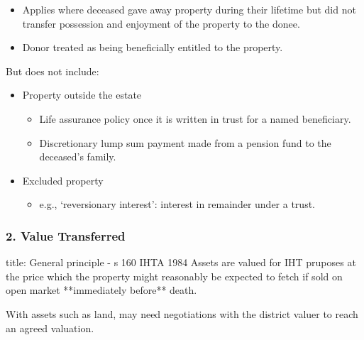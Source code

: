 \documentclass[
]{article}
\newenvironment{Shaded}{}{}
\newcommand{\NormalTok}[1]{#1}
\providecommand{\tightlist}{%
  \setlength{\itemsep}{0pt}\setlength{\parskip}{0pt}}
\begin{document}
\begin{itemize}
\begin{itemize}
    \begin{itemize}
    \tightlist
    \item
      Applies where deceased gave away property during their lifetime
      but did not transfer possession and enjoyment of the property to
      the donee.
    \item
      Donor treated as being beneficially entitled to the property.
    \end{itemize}
  \end{itemize}
\end{itemize}

But does not include:

\begin{itemize}
\tightlist
\item
  Property outside the estate

  \begin{itemize}
  \tightlist
  \item
    Life assurance policy once it is written in trust for a named
    beneficiary.
  \item
    Discretionary lump sum payment made from a pension fund to the
    deceased's family.
  \end{itemize}
\item
  Excluded property

  \begin{itemize}
  \tightlist
  \item
    e.g., `reversionary interest': interest in remainder under a trust.
  \end{itemize}
\end{itemize}

\hypertarget{value-transferred}{%
\subsubsection{2. Value Transferred}\label{value-transferred}}

\begin{Shaded}
\begin{Highlighting}[]
\NormalTok{title: General principle {-} s 160 IHTA 1984}
\NormalTok{Assets are valued for IHT pruposes at \textquotesingle{}the price which the property might reasonably be expected to fetch if sold on open market\textquotesingle{} **immediately before** death.}
\end{Highlighting}
\end{Shaded}

With assets such as land, may need negotiations with the district valuer
to reach an agreed valuation.
\end{document}
